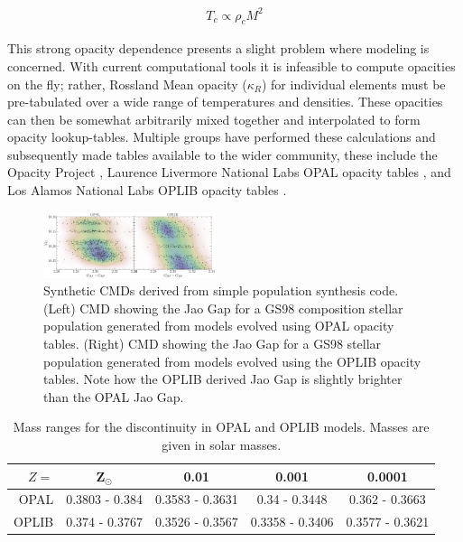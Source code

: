 \begin{align}\label{eqn:TMRelation}
	T_{c} \propto \rho_{c}M^{2}
\end{align}

This strong opacity dependence presents a slight problem where modeling is 
concerned. With current computational tools it is infeasible to compute opacities on the
fly; rather, Rossland Mean opacity ($\kappa_{R}$) for individual elements must
be pre-tabulated over a wide range of temperatures and densities. These
opacities can then be somewhat arbitrarily mixed together and interpolated to
form opacity lookup-tables. Multiple groups have performed these calculations
and subsequently made tables available to the wider community, these include
the Opacity Project \citep[OP][]{Seaton1994}, Laurence Livermore National Labs
OPAL opacity tables \citep{Iglesias1996}, and Los Alamos National Labs OPLIB
opacity tables \citep{Colgan2016}.


\begin{figure}
	\centering
	\includegraphics[width=0.45\textwidth]{src/figures/OPALOPLIB_popsynth_comp.pdf}
	\caption{Synthetic CMDs derived from simple population synthesis code.
	(Left) CMD showing the Jao Gap for a GS98 composition stellar population
	generated from models evolved using OPAL opacity tables. (Right) CMD showing
	the Jao Gap for a GS98 stellar population generated from models evolved
	using the OPLIB opacity tables. Note how the OPLIB derived Jao Gap is
	slightly brighter than the OPAL Jao Gap.}
	\label{fig:JaoGapOPALOPLIB}
\end{figure}



\begin{table}
	\centering
	\begin{tabular}{r | c c c c}
		\hline
		$Z=$ & Z$_{\odot}$ & 0.01 & 0.001 & 0.0001 \\
		\hline
		\hline
		OPAL & 0.3803 - 0.384 & 0.3583 - 0.3631 & 0.34 - 0.3448 & 0.362 - 0.3663 \\
		OPLIB & 0.374 - 0.3767 & 0.3526 - 0.3567 & 0.3358 - 0.3406 & 0.3577 - 0.3621
	\end{tabular}
	\caption{Mass ranges for the discontinuity in OPAL and OPLIB models. Masses
	are given in solar masses.}
	\label{tab:fineMassRange}
\end{table}
